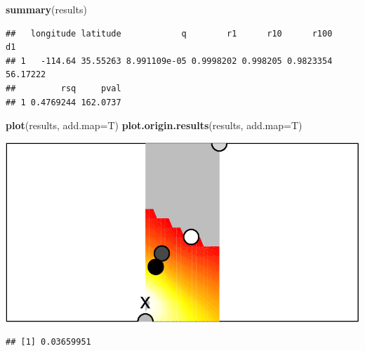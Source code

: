 \documentclass[]{article}
\newenvironment{Shaded}{\begin{snugshade}}{\end{snugshade}}
\newcommand{\KeywordTok}[1]{\textcolor[rgb]{0.13,0.29,0.53}{\textbf{#1}}}
\newcommand{\DataTypeTok}[1]{\textcolor[rgb]{0.13,0.29,0.53}{#1}}
\newcommand{\StringTok}[1]{\textcolor[rgb]{0.31,0.60,0.02}{#1}}
\newcommand{\OperatorTok}[1]{\textcolor[rgb]{0.81,0.36,0.00}{\textbf{#1}}}
\newcommand{\NormalTok}[1]{#1}
\begin{document}
\begin{Shaded}
\begin{Highlighting}[]
\KeywordTok{summary}\NormalTok{(results)}
\end{Highlighting}
\end{Shaded}

\begin{verbatim}
##   longitude latitude            q        r1      r10      r100       d1
## 1   -114.64 35.55263 8.991109e-05 0.9998202 0.998205 0.9823354 56.17222
##         rsq     pval
## 1 0.4769244 162.0737
\end{verbatim}

\begin{Shaded}
\begin{Highlighting}[]
\KeywordTok{plot}\NormalTok{(results, }\DataTypeTok{add.map=}\NormalTok{T)}
\KeywordTok{plot.origin.results}\NormalTok{(results, }\DataTypeTok{add.map=}\NormalTok{T)}
\end{Highlighting}
\end{Shaded}

\includegraphics{range_expansion_files/figure-latex/unnamed-chunk-3-1.pdf}

\begin{Shaded}
\end{Shaded}

\begin{verbatim}
## [1] 0.03659951
\end{verbatim}
\end{document}
